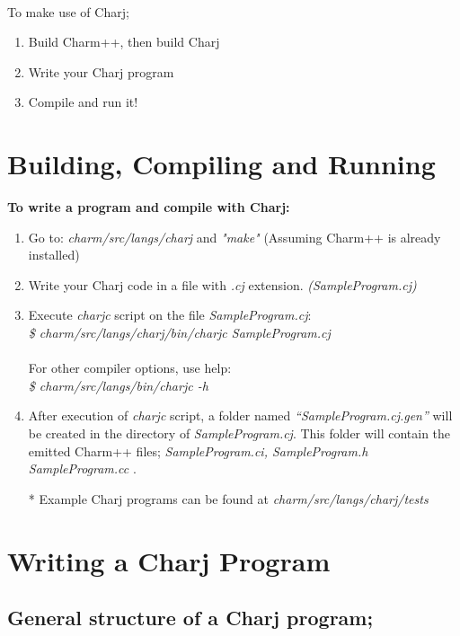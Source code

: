 \documentclass[11pt]{article}
\begin{document}
\begin{verbatim}


\end{verbatim}

To make use of Charj;
\begin{enumerate}
\item Build Charm++, then build Charj
\item Write your Charj program
\item Compile and run it!
\end{enumerate}

\section{Building, Compiling and Running}
{\bf To write a program and compile with Charj:}

\begin{enumerate}
\item Go to: {\it charm/src/langs/charj} and {\it "make" } (Assuming Charm++ is already installed)
\item Write your Charj code in a file with {\it .cj} extension. {\it (SampleProgram.cj)}
\item Execute {\it charjc} script on the file {\it SampleProgram.cj}: \\ {\it \$ charm/src/langs/charj/bin/charjc  SampleProgram.cj} \\ \\ For other compiler options, use help: \\ {\it \$ charm/src/langs/bin/charjc -h}

\item After execution of {\it charjc} script, a folder named {\it“SampleProgram.cj.gen”} will be created in the directory of {\it SampleProgram.cj}. This folder will contain the emitted Charm++ files; {\it SampleProgram.ci, SampleProgram.h SampleProgram.cc }.

* Example Charj programs can be found at {\it charm/src/langs/charj/tests}
\end{enumerate}


\section{Writing a Charj Program}

\subsection{General structure of a Charj program; }
\end{document}
